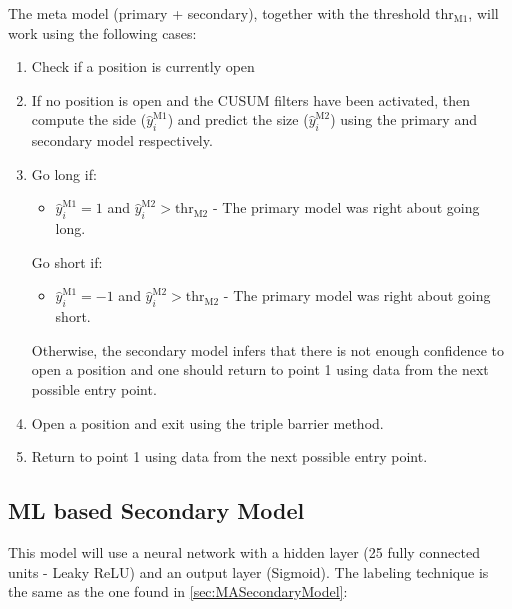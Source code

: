 \documentclass[a4paper]{report}
\begin{document}
\vspace{.2cm}

The meta model (primary + secondary), together with the threshold 
$\text{thr}_{\text{M1}}$, will work using the following cases:

\begin{enumerate}
	\item Check if a position is currently open
	
	\item If no position is open and the CUSUM filters have been activated, 
	then compute the side ($\widehat{y}_i^{\text{M1}}$) and predict the size 
	($\widehat{y}_i^{\text{M2}}$) using the primary and secondary model 
	respectively.
	
	\item 
	Go long if: 
		\begin{itemize}
			\item $\widehat{y}_i^{\text{M1}} = 1$ and 
			$\widehat{y}_i^{\text{M2}} > \text{thr}_{\text{M2}}$ - The 
			primary model was right about going long.
		\end{itemize}
	
	Go short if:
		\begin{itemize}
			\item $\widehat{y}_i^{\text{M1}} = -1$ and 
			$\widehat{y}_i^{\text{M2}} > \text{thr}_{\text{M2}}$ - The 
			primary model was right about going short.
		\end{itemize}

	Otherwise, the secondary model infers that there is not enough 
	confidence to open a position and one should return to point 1 
	using data from the	next possible entry point.
	
	\item Open a position and exit using the triple barrier method.
	
	\item Return to point 1 using data from the next possible entry 
	point.
\end{enumerate}

\subsection{ML based Secondary Model}
\label{sec:MLSecondaryModel}
This model will use a neural network with a hidden layer (25 fully 
connected units - Leaky ReLU) and an output layer (Sigmoid). The 
labeling technique is the same as the one found in 
\ref{sec:MASecondaryModel}:
\end{document}

